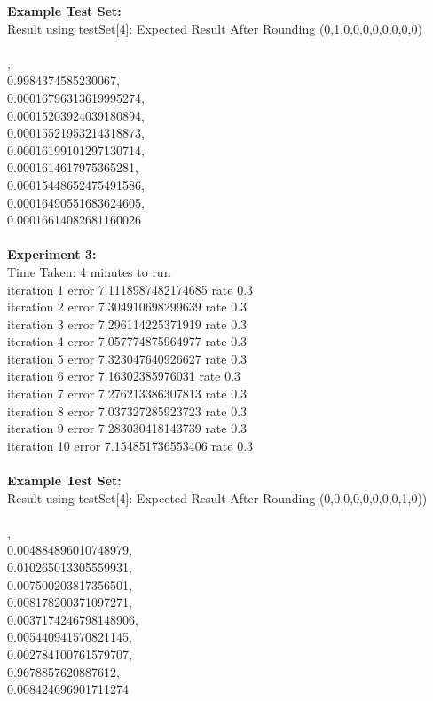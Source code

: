 \documentclass[11pt]{article}
\begin{document}
\begin{page}
\noindent \textbf{Example Test Set:}\\
Result using testSet[4]: Expected Result After Rounding (0,1,0,0,0,0,0,0,0,0)\\\\

,\\
  0.9984374585230067,\\
  0.00016796313619995274,\\
  0.00015203924039180894,\\
  0.00015521953214318873,\\
  0.00016199101297130714,\\
  0.0001614617975365281,\\
  0.00015448652475491586,\\
  0.00016490551683624605,\\
  0.00016614082681160026\\\\

\noindent \textbf{Experiment 3:} \\
Time Taken: 4 minutes to run\\

\noindent iteration 1 error 7.1118987482174685 rate 0.3\\
iteration 2 error 7.304910698299639 rate 0.3\\
iteration 3 error 7.296114225371919 rate 0.3\\
iteration 4 error 7.057774875964977 rate 0.3\\
iteration 5 error 7.323047640926627 rate 0.3\\
iteration 6 error 7.16302385976031 rate 0.3\\
iteration 7 error 7.276213386307813 rate 0.3\\
iteration 8 error 7.037327285923723 rate 0.3\\
iteration 9 error 7.283030418143739 rate 0.3\\
iteration 10 error 7.154851736553406 rate 0.3\\\\

\noindent \textbf{Example Test Set:}\\
Result using testSet[4]: Expected Result After Rounding (0,0,0,0,0,0,0,0,1,0))\\\\

,\\
  0.004884896010748979,\\
  0.010265013305559931,\\
  0.007500203817356501,\\
  0.008178200371097271,\\
  0.0037174246798148906,\\
  0.005440941570821145,\\
  0.002784100761579707,\\
  0.9678857620887612,\\
  0.008424696901711274\\


\end{page}
\end{document}
